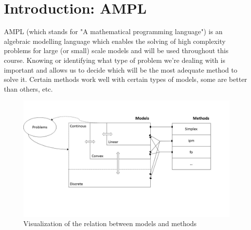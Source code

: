 
%
%

\section{Introduction: AMPL}

AMPL (which stands for "A mathematical programming language") is an algebraic modelling language which enables the solving of high complexity problems for large (or small) scale models and will be used throughout this course. Knowing or identifying what type of problem we're dealing with is important and allows us to decide which will be the most adequate method to solve it. Certain methods work well with certain types of models, some are better than others, etc. \\

\begin{figure}[h!]
\centering
\includegraphics[width=\textwidth]{./images/Course1_Slide1.JPG}
\caption{Visualization of the relation between models and methods}
\label{Figure1}
\end{figure} 

